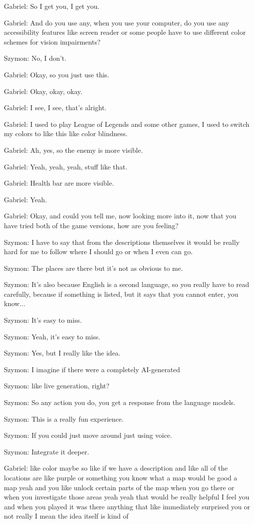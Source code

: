 Gabriel: So I get you, I get you.

Gabriel: And do you use any, when you use your computer, do you use any accessibility features like screen reader or some people have to use different color schemes for vision impairments?

Szymon: No, I don't.

Gabriel: Okay, so you just use this.

Gabriel: Okay, okay, okay.

Gabriel: I see, I see, that's alright.

Gabriel: I used to play League of Legends and some other games, I used to switch my colors to like this like color blindness.

Gabriel: Ah, yes, so the enemy is more visible.

Gabriel: Yeah, yeah, yeah, stuff like that.

Gabriel: Health bar are more visible.

Gabriel: Yeah.

Gabriel: Okay, and could you tell me, now looking more into it, now that you have tried both of the game versions, how are you feeling?

Szymon: I have to say that from the descriptions themselves it would be really hard for me to follow where I should go or when I even can go.

Szymon: The places are there but it's not as obvious to me.

Szymon: It's also because English is a second language, so you really have to read carefully, because if something is listed, but it says that you cannot enter, you know...

Szymon: It's easy to miss.

Szymon: Yeah, it's easy to miss.

Szymon: Yes, but I really like the idea.

Szymon: I imagine if there were a completely AI-generated

Szymon: like live generation, right?

Szymon: So any action you do, you get a response from the language models.

Szymon: This is a really fun experience.

Szymon: If you could just move around just using voice.

Szymon: Integrate it deeper.

Gabriel: like color maybe so like if we have a description and like all of the locations are like purple or something you know what a map would be good a map yeah and you like unlock certain parts of the map when you go there or when you investigate those areas yeah yeah that would be really helpful I feel you and when you played it was there anything that like immediately surprised you or not really I mean the idea itself is kind of

